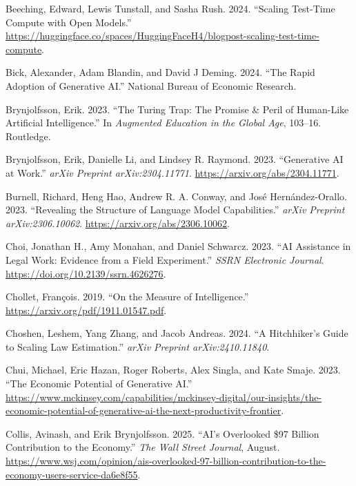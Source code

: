 \documentclass[
  letterpaper,
  DIV=11,
  numbers=noendperiod,
  oneside]{scrartcl}
\newlength{\cslhangindent}
\newenvironment{CSLReferences}[2] %
 {\begin{list}{}{%
  \setlength{\itemindent}{0pt}
  \setlength{\leftmargin}{0pt}
  \setlength{\parsep}{0pt}
  \ifodd #1
   \setlength{\leftmargin}{\cslhangindent}
   \setlength{\itemindent}{-1\cslhangindent}
  \fi
  \setlength{\itemsep}{#2\baselineskip}}}
 {\end{list}}
\begin{document}
\begin{CSLReferences}{1}{0}
Beeching, Edward, Lewis Tunstall, and Sasha Rush. 2024. {``Scaling
Test-Time Compute with Open Models.''}
\url{https://huggingface.co/spaces/HuggingFaceH4/blogpost-scaling-test-time-compute}.

Bick, Alexander, Adam Blandin, and David J Deming. 2024. {``The Rapid
Adoption of Generative AI.''} National Bureau of Economic Research.

Brynjolfsson, Erik. 2023. {``The Turing Trap: The Promise \& Peril of
Human-Like Artificial Intelligence.''} In \emph{Augmented Education in
the Global Age}, 103--16. Routledge.

Brynjolfsson, Erik, Danielle Li, and Lindsey R. Raymond. 2023.
{``Generative AI at Work.''} \emph{arXiv Preprint arXiv:2304.11771}.
\url{https://arxiv.org/abs/2304.11771}.

Burnell, Richard, Heng Hao, Andrew R. A. Conway, and José
Hernández-Orallo. 2023. {``Revealing the Structure of Language Model
Capabilities.''} \emph{arXiv Preprint arXiv:2306.10062}.
\url{https://arxiv.org/abs/2306.10062}.

Choi, Jonathan H., Amy Monahan, and Daniel Schwarcz. 2023. {``AI
Assistance in Legal Work: Evidence from a Field Experiment.''}
\emph{SSRN Electronic Journal}.
\url{https://doi.org/10.2139/ssrn.4626276}.

Chollet, François. 2019. {``On the Measure of Intelligence.''}
\url{https://arxiv.org/pdf/1911.01547.pdf}.

Choshen, Leshem, Yang Zhang, and Jacob Andreas. 2024. {``A Hitchhiker's
Guide to Scaling Law Estimation.''} \emph{arXiv Preprint
arXiv:2410.11840}.

Chui, Michael, Eric Hazan, Roger Roberts, Alex Singla, and Kate Smaje.
2023. {``The Economic Potential of Generative AI.''}
\url{https://www.mckinsey.com/capabilities/mckinsey-digital/our-insights/the-economic-potential-of-generative-ai-the-next-productivity-frontier}.

Collis, Avinash, and Erik Brynjolfsson. 2025. {``AI's Overlooked \$97
Billion Contribution to the Economy.''} \emph{The Wall Street Journal},
August.
\url{https://www.wsj.com/opinion/ais-overlooked-97-billion-contribution-to-the-economy-users-service-da6e8f55}.


\end{CSLReferences}
\end{document}
